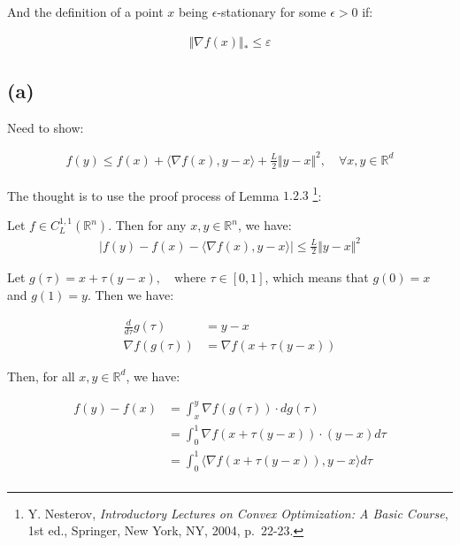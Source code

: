 \documentclass{article}
\begin{document}
And the definition of a point $x$ being $\epsilon$-stationary for some $\epsilon > 0$ if:

\begin{align*}
    \Vert \nabla f (x) \Vert_* \leq \varepsilon
\end{align*}

\subsection*{(a)}

Need to show:

\begin{align*}
    f ( y ) \leq f ( x ) + \langle \nabla f ( x ), y - x \rangle + \frac{L}{2} \Vert y - x \Vert^2 , \quad \forall x, y \in \mathbb{R}^d
\end{align*}

The thought is to use the proof process of Lemma $1.2.3$
\footnote{Y. Nesterov, \textit{Introductory Lectures on Convex Optimization: A Basic Course}, 1st ed., Springer, New York, NY, 2004, p.~22-23.}:

\begin{tcolorbox}[greenbox, title = Lemma 1.2.3]
    Let $f \in C^{1,1}_L(\mathbb{R}^n)$. Then for any $x, y \in \mathbb{R}^n$, we have:
    \begin{align*}
        |f ( y ) - f ( x ) - \langle \nabla f ( x ), y - x \rangle| \leq \frac{L}{2} \Vert y - x \Vert^2
    \end{align*}
\end{tcolorbox}

Let $g(\tau) = x + \tau (y - x), \quad \text{where } \tau \in [0, 1]$, 
which means that $g(0) = x$ and $g(1) = y$.
Then we have:

\begin{align*}
    \frac{d}{d\tau} g(\tau) &= y - x \\
    \nabla f ( g(\tau) ) &= \nabla f ( x + \tau ( y - x ) ) 
\end{align*}

Then, for all $x, y \in \mathbb{R}^d$, we have:

\begin{align*}
    f(y) - f(x) 
    &= \int^{y}_{x} \nabla f ( g(\tau) ) \cdot d g(\tau) \\
    &= \int^{1}_{0} \nabla f ( x + \tau ( y - x ) ) \cdot ( y - x ) d\tau \\
    &= \int^{1}_{0} \langle \nabla f ( x + \tau ( y - x ) ) , y - x \rangle d\tau \\
\end{align*}
\end{document}
